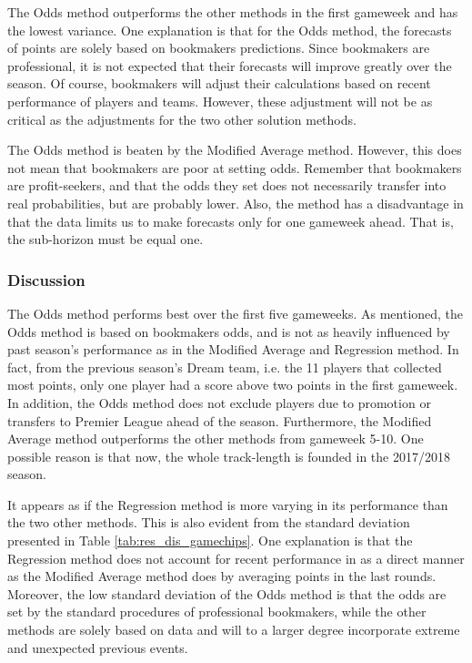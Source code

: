 \newpar

The Odds method outperforms the other methods in the first gameweek and has the lowest variance. One explanation is that for the Odds method, the forecasts of points are solely based on bookmakers predictions. Since bookmakers are professional, it is not expected that their forecasts will improve greatly over the season. Of course, bookmakers will adjust their calculations based on recent performance of players and teams. However, these adjustment will not be as critical as the adjustments for the two other solution methods. 

\newpar

The Odds method is beaten by the Modified Average method. However, this does not mean that bookmakers are poor at setting odds. Remember that bookmakers are profit-seekers, and that the odds they set does not necessarily transfer into real probabilities, but are probably lower. Also, the method has a disadvantage in that the data limits us to make forecasts only for one gameweek ahead. That is, the sub-horizon must be equal one.


\subsubsection{Discussion}

The Odds method performs best over the first five gameweeks. As mentioned, the Odds method is based on bookmakers odds, and is not as heavily influenced by past season's performance as in the Modified Average and Regression method. In fact, from the previous season's Dream team, i.e. the 11 players that collected most points, only one player had a score above two points in the first gameweek. In addition, the Odds method does not exclude players due to promotion or transfers to Premier League ahead of the season. Furthermore, the Modified Average method outperforms the other methods from gameweek 5-10. One possible reason is that now, the whole track-length is founded in the 2017/2018 season.

\newpar

It appears as if the Regression method is more varying in its performance than the two other methods. This is also evident from the standard deviation presented in Table \ref{tab:res_dis_gamechips}. One explanation is that the Regression method does not account for recent performance in as a direct manner as the Modified Average method does by averaging points in the last rounds. Moreover, the low standard deviation of the Odds method is that the odds are set by the standard procedures of professional bookmakers, while the other methods are solely based on data and will to a larger degree incorporate extreme and unexpected previous events.

